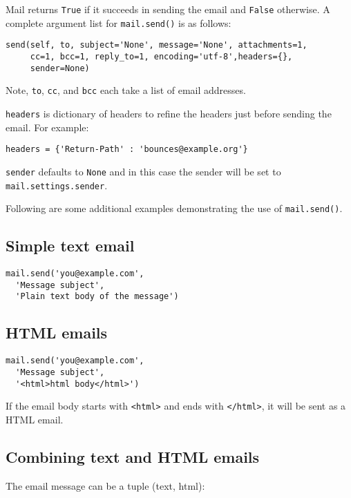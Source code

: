 \documentclass[justified,sixbynine,notoc]{tufte-book}
\def\ft{\small\tt}
\begin{document}
\begin{fullwidth}
Mail returns {\ft True} if it succeeds in sending the email and {\ft False} otherwise.  A complete argument list for {\ft mail.send()} is as follows:

\begin{lstlisting}
send(self, to, subject='None', message='None', attachments=1,
     cc=1, bcc=1, reply_to=1, encoding='utf-8',headers={},
     sender=None)
\end{lstlisting}

Note, {\ft to}, {\ft cc}, and {\ft bcc} each take a list of email addresses.

{\ft headers} is dictionary of headers to refine the headers just before sending the email. For example:

\begin{lstlisting}
headers = {'Return-Path' : 'bounces@example.org'}
\end{lstlisting}

{\ft sender} defaults to {\ft None} and in this case the sender will be set to {\ft mail.settings.sender}.

Following are some additional examples demonstrating the use of {\ft mail.send()}.

\goodbreak\subsection{Simple text email}

\begin{lstlisting}
mail.send('you@example.com',
  'Message subject',
  'Plain text body of the message')
\end{lstlisting}

\goodbreak\subsection{HTML emails}

\begin{lstlisting}
mail.send('you@example.com',
  'Message subject',
  '<html>html body</html>')
\end{lstlisting}

If the email body starts with {\ft <html>} and ends with {\ft </html>}, it will be sent as a HTML email.

\goodbreak\subsection{Combining text and HTML emails}

The email message can be a tuple (text, html):


\end{fullwidth}
\end{document}
